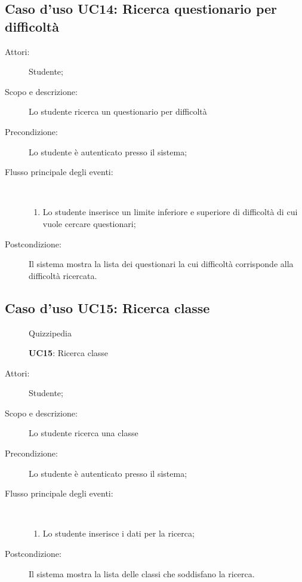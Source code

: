 \subsection{Caso d'uso UC14: Ricerca questionario per difficoltà}\begin{description}
\item[Attori:] Studente;
\item[Scopo e descrizione:] Lo studente ricerca un questionario per difficoltà
      \item[Precondizione:] Lo studente è autenticato presso il sistema;

        \item[Flusso principale degli eventi:] \ 
 \begin{enumerate}
          \item Lo studente inserisce un limite inferiore e superiore di difficoltà di cui vuole cercare questionari;

      \end{enumerate}
    \item[Postcondizione:] Il sistema mostra la lista dei questionari la cui difficoltà corrisponde alla difficoltà ricercata.
  \end{description}
\hypertarget{UC15}{}
\subsection{Caso d'uso UC15: Ricerca classe}
	\begin{figure}[H]
		\centering
		\begin{resizedtikzpicture}{\textwidth}
		\begin{umlsystem}[x=0, fill=lightgray!20]{Quizzipedia}
			\umlassoc{Studente}{28}
			\umlinherit{30}{28}
			\umlinherit{29}{28}
		\end{umlsystem}
		\end{resizedtikzpicture}
		\caption{\textbf{UC15}: Ricerca classe}
		\label{UC15}
	\end{figure}
\begin{description}
\item[Attori:] Studente;
\item[Scopo e descrizione:] Lo studente ricerca una classe
      \item[Precondizione:] Lo studente è autenticato presso il sistema;

        \item[Flusso principale degli eventi:] \ 
 \begin{enumerate}
          \item Lo studente inserisce i dati per la ricerca;

      \end{enumerate}
    \item[Postcondizione:] Il sistema mostra la lista delle classi che soddisfano la ricerca.
  \end{description}
\hypertarget{UC16}{}
